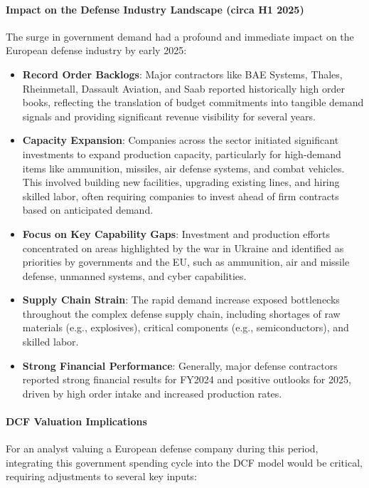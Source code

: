 \paragraph{Impact on the Defense Industry Landscape (circa H1 2025)}
The surge in government demand had a profound and immediate impact on the European defense industry by early 2025:
\begin{itemize}
    \item \textbf{Record Order Backlogs}: Major contractors like BAE Systems, Thales, Rheinmetall, Dassault Aviation, and Saab reported historically high order books, reflecting the translation of budget commitments into tangible demand signals and providing significant revenue visibility for several years.
    \item \textbf{Capacity Expansion}: Companies across the sector initiated significant investments to expand production capacity, particularly for high-demand items like ammunition, missiles, air defense systems, and combat vehicles. This involved building new facilities, upgrading existing lines, and hiring skilled labor, often requiring companies to invest ahead of firm contracts based on anticipated demand.
    \item \textbf{Focus on Key Capability Gaps}: Investment and production efforts concentrated on areas highlighted by the war in Ukraine and identified as priorities by governments and the EU, such as ammunition, air and missile defense, unmanned systems, and cyber capabilities.
    \item \textbf{Supply Chain Strain}: The rapid demand increase exposed bottlenecks throughout the complex defense supply chain, including shortages of raw materials (e.g., explosives), critical components (e.g., semiconductors), and skilled labor.
    \item \textbf{Strong Financial Performance}: Generally, major defense contractors reported strong financial results for FY2024 and positive outlooks for 2025, driven by high order intake and increased production rates.
\end{itemize}

\paragraph{DCF Valuation Implications}
For an analyst valuing a European defense company during this period, integrating this government spending cycle into the DCF model would be critical, requiring adjustments to several key inputs:

